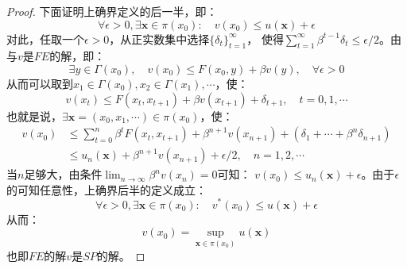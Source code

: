 \begin{proof}
    下面证明上确界定义的后一半，即：
    \begin{equation*}
        \forall \epsilon > 0, \exists \boldsymbol{x}\in\pi\left(x_0\right): 
            \quad v\left(x_0\right)\leq u\left(\boldsymbol{x}\right)+\epsilon  
    \end{equation*}
    对此，任取一个$\epsilon>0$，从正实数集中选择$\{\delta_t\}_{t=1}^{\infty}$，
    使得$\sum_{t=1}^{\infty}\beta^{t-1}\delta_t\leq \epsilon /2$。由与$v$是$FE$的解，即：
    \begin{equation*}
        \exists y\in \Gamma\left(x_0\right),\quad v\left(x_0\right)\leq F\left(x_0,y\right) + \beta v\left(y\right), 
            \quad \forall \epsilon > 0
    \end{equation*}
    从而可以取到$x_1\in\Gamma\left(x_0\right), x_2\in\Gamma\left(x_1\right),\cdots$，使：
    \begin{equation*}
        v\left(x_t\right)\leq F\left(x_t,x_{t+1}\right)+\beta v\left(x_{t+1}\right)+\delta_{t+1},\quad t=0,1,\cdots
    \end{equation*}
    也就是说，$\exists\boldsymbol{x}=\left(x_0,x_1,\cdots\right)\in \pi\left(x_0\right)$，使：
    \begin{equation*}
        \begin{aligned}
            v\left(x_0\right) &\leq \sum_{t=0}^{n}\beta^t F\left(x_t,x_{t+1}\right) + 
                \beta^{n+1}v\left(x_{n+1}\right) + \left(\delta_1+\cdots+\beta^n \delta_{n+1}\right)   \\
                &\leq u_n\left(\boldsymbol{x}\right)+\beta^{n+1}v\left(x_{n+1}\right)+\epsilon/2, \quad n=1,2,\cdots
        \end{aligned}
    \end{equation*}
    当$n$足够大，由条件$\lim_{n\rightarrow \infty}\beta^n v\left(x_n\right)=0$可知：
       $v\left(x_0\right)\leq u_n\left(\boldsymbol{x}\right)+\epsilon$。由于$\epsilon$的可知任意性，上确界后半的定义成立：
    \begin{equation*}
        \forall \epsilon > 0, \exists \boldsymbol{x}\in\pi\left(x_0\right): 
            \quad v^*\left(x_0\right)\leq u\left(\boldsymbol{x}\right)+\epsilon
    \end{equation*}
    从而：
    \begin{equation*}
        v\left(x_0\right)=\sup _{\boldsymbol{x}\in\pi\left(x_0\right)} u\left(\boldsymbol{x}\right)
    \end{equation*}
    也即$FE$的解$v$是$SP$的解。
\end{proof}

